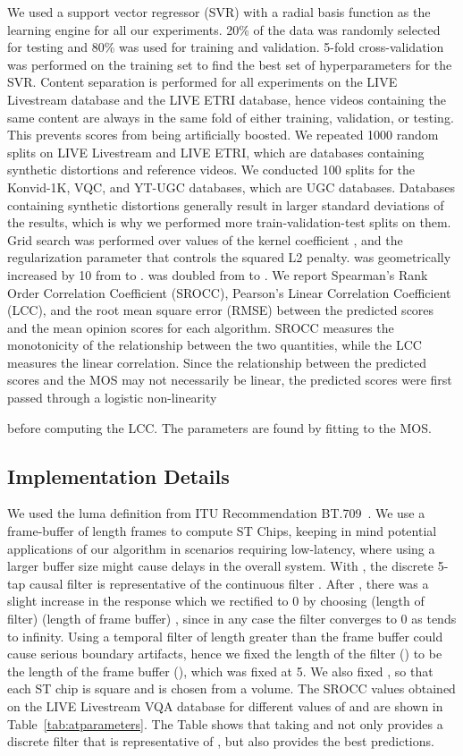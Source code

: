 \documentclass[journal]{IEEEtran}
\begin{document}
We used a support vector regressor (SVR) with a radial basis function as the learning engine for all our experiments. 20\% of the data was randomly selected for testing and 80\% was used for training and validation. 5-fold cross-validation was performed on the training set to find the best set of hyperparameters for the SVR. Content separation is performed for all experiments on the LIVE Livestream database and the LIVE ETRI database, hence videos containing the same content are always in the same fold of either training, validation, or testing. This prevents scores from being artificially boosted. We repeated 1000 random splits on LIVE Livestream and LIVE ETRI, which are databases containing synthetic distortions and reference videos. We conducted 100 splits for the Konvid-1K, VQC, and YT-UGC databases, which are UGC databases. Databases containing synthetic distortions generally result in larger standard deviations of the results, which is why we performed more train-validation-test splits on them. Grid search was performed over values of the kernel coefficient , and the regularization parameter  that controls the squared L2 penalty.  was geometrically increased by 10 from  to .  was doubled from  to . We report Spearman's Rank Order Correlation Coefficient (SROCC), Pearson's Linear Correlation Coefficient (LCC), and the root mean square error (RMSE) between the predicted scores and the mean opinion scores for each algorithm. SROCC measures the monotonicity of the relationship between the two quantities, while the LCC measures the linear correlation. Since the relationship between the predicted scores and the MOS may not necessarily be linear, the predicted scores  were first passed through a logistic non-linearity~\cite{logistic}

before computing the LCC. The parameters are found by fitting  to the MOS.

\vspace{-3mm}
\subsection{Implementation Details}\label{exp_impl}
We used the luma definition from ITU Recommendation BT.709~\cite{bt709}. We use a frame-buffer of length  frames to compute ST Chips, keeping in mind potential applications of our algorithm in scenarios requiring low-latency, where using a larger buffer size might cause delays in the overall system. With , the discrete 5-tap causal filter  is representative of the continuous filter . After , there was a slight increase in the response which we rectified to 0 by choosing  (length of filter)  (length of frame buffer) , since in any case the filter converges to 0 as  tends to infinity. Using a temporal filter of length greater than the frame buffer could cause serious boundary artifacts, hence we fixed the length of the filter () to be the length of the frame buffer (), which was fixed at 5. We also fixed , so that each ST chip is square and is chosen from a  volume. The SROCC  values obtained on the LIVE Livestream VQA database for different values of  and  are shown in Table~\ref{tab:atparameters}. The Table shows that taking  and  not only provides a discrete filter that is representative of , but also provides the best predictions. 
\end{document}
